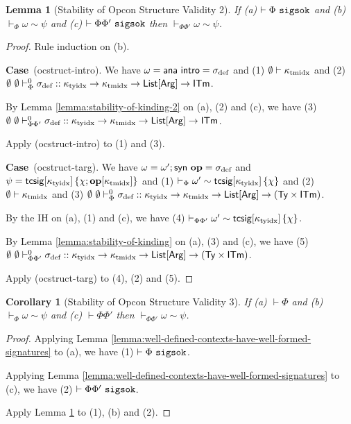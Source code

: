 \documentclass[12pt]{article}
\newtheorem{lemma}{Lemma}
\newtheorem{corollary}{Corollary}
\newcommand{\pfcase}[1]{\textbf{Case}~#1. }
\begin{document}
\begin{lemma}[Stability of Opcon Structure Validity 2]
\label{lemma:stability-of-opcon-structure-validity-2}
If (a) $\vdash \Phi~\mathtt{sigsok}$ and (b) $\vdash_\Phi \omega \sim \psi$ and (c)  $\vdash \Phi\Phi'~\mathtt{sigsok}$ then $\vdash_{\Phi\Phi'} \omega \sim \psi$. 
\end{lemma}
\begin{proof} Rule induction on (b).

\pfcase{(ocstruct-intro)} We have $\omega={\sf ana}~{\sf intro}=\sigma_\text{def}$ and (1) $\emptyset \vdash \kappa_\text{tmidx}$ and (2) $
    \emptyset~\emptyset \vdash_{\Phi}^{0} \sigma_\text{def} :: \kappa_\text{tyidx} \rightarrow \kappa_\text{tmidx} \rightarrow {\sf List}[{\sf Arg}] \rightarrow {\sf ITm}$.

    By Lemma \ref{lemma:stability-of-kinding-2} on (a), (2) and (c), we have (3) $
    \emptyset~\emptyset \vdash_{\Phi\Phi'}^{0} \sigma_\text{def} :: \kappa_\text{tyidx} \rightarrow \kappa_\text{tmidx} \rightarrow {\sf List}[{\sf Arg}] \rightarrow {\sf ITm}$.

    Apply (ocstruct-intro) to (1) and (3).

\pfcase{(ocstruct-targ)} We have $\omega=\omega'; {\sf syn}~\textbf{op}=\sigma_\text{def}$ and $\psi={\sf tcsig}[\kappa_\text{tyidx}]\,\{\chi; \textbf{op}[\kappa_\text{tmidx}]\}$ and (1) $\vdash_\Phi \omega' \sim {\sf tcsig}[\kappa_\text{tyidx}]\,\{\chi\}$ and (2) $\emptyset \vdash \kappa_\text{tmidx}$ and (3) $\emptyset~\emptyset \vdash_{\Phi}^{0} \sigma_\text{def} :: \kappa_\text{tyidx} \rightarrow \kappa_\text{tmidx} \rightarrow {\sf List}[{\sf Arg}] \rightarrow ({\sf Ty} \times {\sf ITm})$.

By the IH on (a), (1) and (c), we have (4) $\vdash_{\Phi\Phi'} \omega' \sim {\sf tcsig}[\kappa_\text{tyidx}]\,\{\chi\}$.

By Lemma \ref{lemma:stability-of-kinding} on (a), (3) and (c), we have (5) $\emptyset~\emptyset \vdash_{\Phi\Phi'}^{0} \sigma_\text{def} :: \kappa_\text{tyidx} \rightarrow \kappa_\text{tmidx} \rightarrow {\sf List}[{\sf Arg}] \rightarrow ({\sf Ty} \times {\sf ITm})$.

Apply (ocstruct-targ) to (4), (2) and (5).
\end{proof}

\begin{corollary}[Stability of Opcon Structure Validity 3]
\label{lemma:stability-of-opcon-structure-validity-3}
If (a) $\vdash \Phi$ and (b) $\vdash_\Phi \omega \sim \psi$ and (c) $\vdash \Phi\Phi'$ then $\vdash_{\Phi\Phi'} \omega \sim \psi$.
\end{corollary}
\begin{proof} Applying Lemma \ref{lemma:well-defined-contexts-have-well-formed-signatures} to (a), we have (1) $\vdash \Phi~\mathtt{sigsok}$. 

Applying Lemma \ref{lemma:well-defined-contexts-have-well-formed-signatures} to (c), we have (2) $\vdash \Phi\Phi'~\mathtt{sigsok}$.

Apply Lemma \ref{lemma:stability-of-opcon-structure-validity-2} to (1), (b) and (2).
\end{proof}
\end{document}
